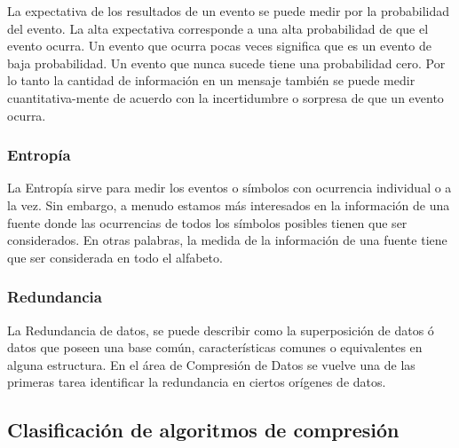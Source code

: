 La expectativa de los resultados de un evento se puede medir por la probabilidad del evento. La alta expectativa corresponde a una alta probabilidad de que el evento ocurra. Un evento que ocurra pocas veces significa que es un evento de baja probabilidad. Un evento que nunca sucede tiene una probabilidad cero. Por lo tanto la cantidad de información en un mensaje también se puede medir cuantitativa-mente de acuerdo con la incertidumbre o sorpresa de que un evento ocurra.





\subsubsection{Entropía}\label{ch2:concept-entropia}

La Entropía sirve para medir los eventos o símbolos con ocurrencia individual o a la vez. Sin embargo, a menudo estamos más interesados en la información de una fuente donde las ocurrencias de todos los símbolos posibles tienen que ser considerados. En otras palabras, la medida de la información de una fuente tiene que ser considerada en todo el alfabeto.





\subsubsection{Redundancia}\label{ch2:concept-redundacia}

La Redundancia de datos, se puede describir como la superposición de datos ó datos que poseen una base común, características comunes o equivalentes en alguna estructura. En el área de Compresión de Datos se vuelve una de las primeras tarea identificar la redundancia en ciertos orígenes de datos.


 






\uncm
\subsection{Clasificación de algoritmos de compresión}\label{sec-clas-alg-compreessdata} 


